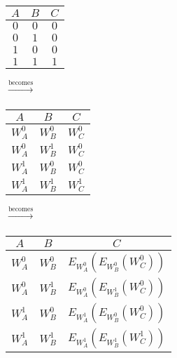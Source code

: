 \begin{itemize}
  \begin{minipage}{0.2\textwidth}
    \begin{center}
      \begin{tabular}{ c c | c }
       $A$ & $B$ & $C$ \\
       \hline
       $0$ & $0$ & $0$ \\
       $0$ & $1$ & $0$ \\
       $1$ & $0$ & $0$ \\
       $1$ & $1$ & $1$ \\
      \end{tabular}
    \end{center}
  \end{minipage}
  $\xrightarrow[]{\text{becomes}}$
  \begin{minipage}{0.2\textwidth}
    \begin{center}
      \begin{tabular}{ c c | c }
       $A$ & $B$ & $C$ \\
       \hline
       $W_A^0$ & $W_B^0$ & $W_C^0$ \\
       $W_A^0$ & $W_B^1$ & $W_C^0$ \\
       $W_A^1$ & $W_B^0$ & $W_C^0$ \\
       $W_A^1$ & $W_B^1$ & $W_C^1$ \\
      \end{tabular}
    \end{center}
  \end{minipage}
  $\xrightarrow[]{\text{becomes}}$
  \begin{minipage}{0.2\textwidth}
    \begin{center}
      \begin{tabular}{ c c | c }
       $A$ & $B$ & $C$ \\
       \hline
       $W_A^0$ & $W_B^0$ & $E_{W_A^0}(E_{W_B^0}(W_C^0))$ \\
       $W_A^0$ & $W_B^1$ & $E_{W_A^0}(E_{W_B^1}(W_C^0))$ \\
       $W_A^1$ & $W_B^0$ & $E_{W_A^1}(E_{W_B^0}(W_C^0))$ \\
       $W_A^1$ & $W_B^1$ & $E_{W_A^1}(E_{W_B^1}(W_C^1))$ \\
      \end{tabular}
    \end{center}
  \end{minipage}
\end{itemize}


